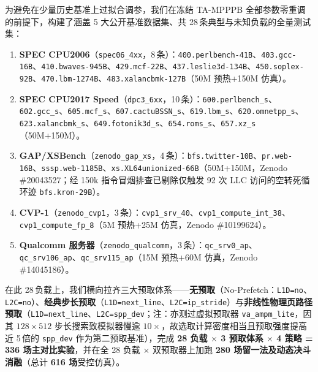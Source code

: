\documentclass[10.5pt,compsoc,UTF8]{CjC}
\begin{document}
为避免在少量历史基准上过拟合调参，我们在冻结 TA-MPPPB 全部参数零重调的前提下，构建了涵盖 5 大公开基准数据集、共 28\,条典型与未知负载的全量测试集：
\begin{enumerate}[leftmargin=1.4em,itemsep=1.5pt]
  \item \textbf{SPEC CPU2006}（\texttt{spec06\_4xx}，8\,条）：\texttt{400.\allowbreak perlbench-\allowbreak 41B}、\texttt{403.\allowbreak gcc-16B}、\texttt{410.\allowbreak bwaves-\allowbreak 945B}、\texttt{429.\allowbreak mcf-22B}、\texttt{437.\allowbreak leslie3d-\allowbreak 134B}、\texttt{450.\allowbreak soplex-\allowbreak 92B}、\texttt{470.\allowbreak lbm-\allowbreak 1274B}、\texttt{483.\allowbreak xalancbmk-\allowbreak 127B}（50M 预热+150M 仿真）。
  \item \textbf{SPEC CPU2017 Speed}（\texttt{dpc3\_6xx}，10\,条）：\texttt{600.\allowbreak perlbench\_s}、\texttt{602.\allowbreak gcc\_s}、\texttt{605.\allowbreak mcf\_s}、\texttt{607.\allowbreak cactuBSSN\_s}、\texttt{619.\allowbreak lbm\_s}、\texttt{620.\allowbreak omnetpp\_s}、\texttt{623.\allowbreak xalancbmk\_s}、\texttt{649.\allowbreak fotonik3d\_s}、\texttt{654.\allowbreak roms\_s}、\texttt{657.\allowbreak xz\_s}（50M+150M）。
  \item \textbf{GAP/XSBench}（\texttt{zenodo\_\allowbreak gap\_xs}，4\,条）：\texttt{bfs.\allowbreak twitter-10B}、\texttt{pr.\allowbreak web-16B}、\texttt{sssp.\allowbreak web-1185B}、\texttt{xs.\allowbreak XL64unionized-\allowbreak 66B}（50M+150M，\mbox{Zenodo} \#20043527；经 150k 指令冒烟排查已剔除仅触发 92 次 LLC 访问的空转死循环迹 \texttt{bfs.\allowbreak kron-29B}）。
  \item \textbf{CVP-1}（\texttt{zenodo\_cvp1}，3\,条）：\texttt{cvp1\_\allowbreak srv\_40}、\texttt{cvp1\_\allowbreak compute\_\allowbreak int\_38}、\texttt{cvp1\_\allowbreak compute\_\allowbreak fp\_8}（5M 预热+25M 仿真，\mbox{Zenodo} \#10199624）。
  \item \textbf{Qualcomm 服务器}（\texttt{zenodo\_\allowbreak qualcomm}，3\,条）：\texttt{qc\_\allowbreak srv0\_ap}、\texttt{qc\_\allowbreak srv106\_ap}、\texttt{qc\_\allowbreak srv115\_ap}（15M 预热+60M 仿真，\mbox{Zenodo} \#14045186）。
\end{enumerate}

在此 28\,负载上，我们横向拉齐三大预取体系——\textbf{无预取}（No-Prefetch：\texttt{L1D=no}、\texttt{L2C=no}）、\textbf{经典步长预取}（\texttt{L1D=next\_line}、\texttt{L2C=ip\_stride}）与\textbf{非线性物理页路径预取}（\texttt{L1D=next\_line}、\texttt{L2C=spp\_dev}；注：亦测过虚拟预取器 \texttt{va\_\allowbreak ampm\_lite}，因其 $128\times 512$ 步长搜索致模拟器慢逾 $10\times$，故选取计算密度相当且预取强度提高近 5\,倍的 \texttt{spp\_dev} 作为第二预取基准），完成 \textbf{28 负载 $\times$ 3 预取体系 $\times$ 4 策略 = 336 场主对比实验}，并在全 28 负载 $\times$ 双预取器上加跑 \textbf{280 场留一法及动态决斗消融}（总计 \textbf{616 场}受控仿真）。
\end{document}
